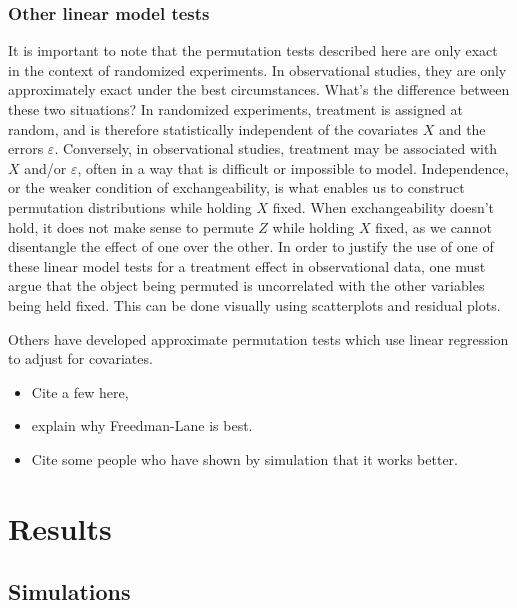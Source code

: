 \documentclass[11pt]{article}
\newcommand{\bit}{\begin{itemize}}
\newcommand{\eit}{\end{itemize}}
\newcommand{\todo}[1]{{\color{red}{TO DO: \sc #1}}}
\begin{document}
\subsubsection{Other linear model tests}
It is important to note that the permutation tests described here are only exact in the context of randomized experiments.
In observational studies, they are only approximately exact under the best circumstances.
What's the difference between these two situations?
In randomized experiments, treatment is assigned at random, and is therefore statistically independent of the covariates $X$ and the errors $\varepsilon$.
Conversely, in observational studies, treatment may be associated with $X$ and/or $\varepsilon$, often in a way that is difficult or impossible to model.
Independence, or the weaker condition of exchangeability, is what enables us to construct permutation distributions while holding $X$ fixed.
When exchangeability doesn't hold, it does not make sense to permute $Z$ while holding $X$ fixed, as we cannot disentangle the effect of one over the other.
In order to justify the use of one of these linear model tests for a treatment effect in observational data, one must argue that the object being permuted is uncorrelated with the other variables being held fixed.
This can be done visually using scatterplots and residual plots.
\todo{citations!}

Others have developed approximate permutation tests which use linear regression to adjust for covariates. 
\bit
\item Cite a few here, 
\item explain why Freedman-Lane is best. 
\item Cite some people who have shown by simulation that it works better.
\eit


\section{Results}
\subsection{Simulations}
\end{document}
